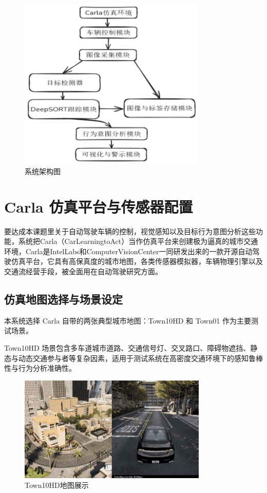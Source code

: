 \begin{figure}[H]
    \centering
    \includegraphics[width=0.8\textwidth]{images/图3 系统架构图.pdf}  %
    \caption{系统架构图}
    \label{fig:system}  %
\end{figure}

\section{Carla 仿真平台与传感器配置}

要达成本课题里关于自动驾驶车辆的控制，视觉感知以及目标行为意图分析这些功能，系统把Carla（CarLearningtoAct）当作仿真平台来创建极为逼真的城市交通环境，Carla是IntelLabs和ComputerVisionCenter一同研发出来的一款开源自动驾驶仿真平台，它具有高保真度的城市地图，各类传感器模拟器，车辆物理引擎以及交通流经营手段，被全面用在自动驾驶研究方面。

\subsection{仿真地图选择与场景设定}

本系统选择 Carla 自带的两张典型城市地图：Town10HD 和 Town01 作为主要测试场景。

Town10HD 场景包含多车道城市道路、交通信号灯、交叉路口、障碍物遮挡、静态与动态交通参与者等复杂因素，适用于测试系统在高密度交通环境下的感知鲁棒性与行为分析准确性。

\begin{figure}[H]
    \centering
    \includegraphics[width=0.8\textwidth]{images/图4 Town10HD地图展示.pdf}  %
    \caption{Town10HD地图展示}
    \label{fig:example_image}  %
\end{figure}

